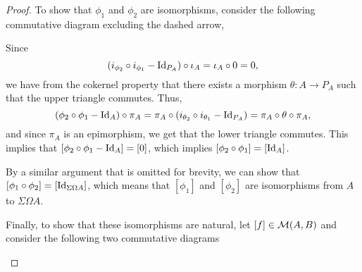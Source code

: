 \begin{proof}
    To show that \( \phi_1 \) and \( \phi_2 \) are isomorphisms, consider the following commutative diagram excluding the dashed arrow,
    \begin{center}
    \end{center}

    Since
    \[
        (i_{\phi_2} \circ i_{\phi_1} - \operatorname{Id}_{P_A}) \circ \iota_A = \iota_A \circ 0 = 0,
    \]
    we have from the cokernel property that there exists a morphism \( \theta: A \to P_A \) such that the upper triangle commutes. Thus,
    \[
        (\phi_2 \circ \phi_1 - \operatorname{Id}_A) \circ \pi_A = \pi_A \circ (i_{\theta_2} \circ i_{\theta_1} - \operatorname{Id}_{P_A}) = \pi_A \circ \theta \circ \pi_A,
    \]
    and since \( \pi_A \) is an epimorphism, we get that the lower triangle commutes. This implies that \( [\phi_2 \circ \phi_1 - \operatorname{Id}_A] = [0] \), which implies \( [\phi_2 \circ \phi_1] = [\operatorname{Id}_A] \).
    
    By a similar argument that is omitted for brevity, we can show that \( [\phi_1 \circ \phi_2] = [\operatorname{Id}_{\Sigma\Omega A}] \), which means that \( [\phi_1] \) and \( [\phi_2] \) are isomorphisms from \( A \) to \( \Sigma\Omega A \).

    Finally, to show that these isomorphisms are natural, let \( [f] \in {\mathcal{M}}(A, B) \) and consider the following two commutative diagrams
    \begin{center}
\end{center}
\end{proof}
